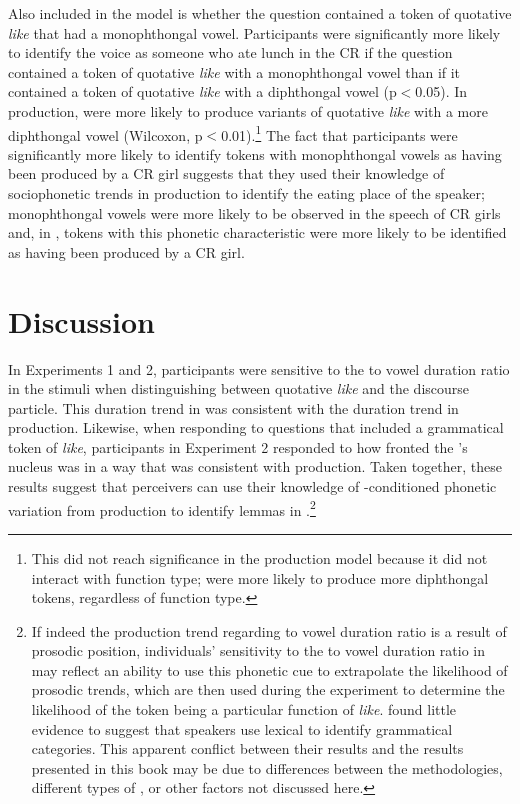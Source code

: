 Also included in the model is whether the question contained a token of quotative \textit{like} that had a monophthongal vowel. Participants were significantly more likely to identify the voice as someone who ate lunch in the CR if the question contained a token of quotative \textit{like} with a monophthongal vowel than if it contained a token of quotative \textit{like} with a diphthongal vowel (p$<$0.05). In production,  were more likely to produce variants of quotative \textit{like} with a more diphthongal vowel (Wilcoxon, p$<$0.01).\footnote{This did not reach significance in the production model because it did not interact with function type;  were more likely to produce more diphthongal tokens, regardless of function type.} The fact that participants were significantly more likely to identify tokens with monophthongal vowels as having been produced by a CR girl suggests that they used their knowledge of sociophonetic trends in production to identify the eating place of the speaker; monophthongal vowels were more likely to be observed in the speech of CR girls and, in , tokens with this phonetic characteristic were more likely to be identified as having been produced by a CR girl. 

\section{Discussion}

In Experiments 1 and 2, participants were sensitive to the  to vowel duration ratio in the stimuli when distinguishing between quotative \textit{like} and the discourse particle. This duration trend in  was consistent with the duration trend in production. Likewise, when responding to questions that included a grammatical token of \textit{like}, participants in Experiment 2 responded to how fronted the 's nucleus was in a way that was consistent with production. Taken together, these results suggest that perceivers can use their knowledge of -conditioned phonetic variation from production to identify lemmas in .\footnote{If indeed the production trend regarding  to vowel duration ratio is a result of prosodic position, individuals' sensitivity to the  to vowel duration ratio in  may reflect an ability to use this phonetic cue to extrapolate the likelihood of prosodic trends, which are then used during the experiment to determine the likelihood of the token being a particular function of \textit{like}. \citet{cutlerclifton1984} found little evidence to suggest that speakers use lexical  to identify grammatical categories. This apparent conflict between their results and the results presented in this book may be due to differences between the methodologies, different types of , or other factors not discussed here.}


